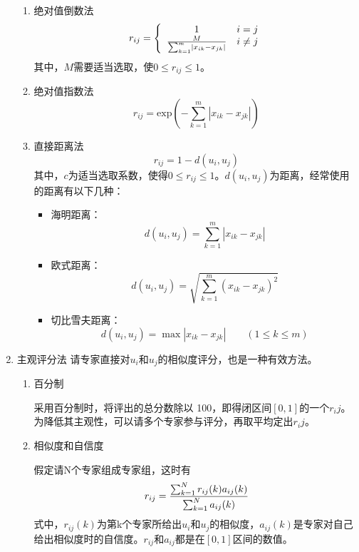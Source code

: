 \begin{enumerate}[label=（\arabic*）]
	\begin{enumerate}[label=（\alph*）]
		\item 绝对值倒数法
		\begin{equation}
			r_{ij} = \left\lbrace 
			\begin{array}{cl}
			1 & i=j \\
			{M \over \sum_{k=1}^{m} \left| x_{ik}-x_{jk} \right| } &  i\neq j
			\end{array}
			\right. 
		\end{equation}
		其中，$M$需要适当选取，使$0\leqslant r_{ij}\leqslant1$。
		\item 绝对值指数法
			\begin{equation}
				r_{ij} = \mathrm{exp}(-\sum_{k=1}^{m} \left| x_{ik}-x_{jk} \right| )
			\end{equation}
		\item 直接距离法
			\begin{equation}
				r_{ij} = 1-d(u_i,u_j)
			\end{equation}
		其中，$c$为适当选取系数，使得$0\leqslant r_{ij}\leqslant1$。$d(u_i,u_j)$为距离，经常使用的距离有以下几种：
		\begin{itemize}
			\item 海明距离：
				\begin{equation}
					d(u_i,u_j) = \sum_{k=1}^{m} \left| x_{ik}-x_{jk} \right|
				\end{equation}
			\item 欧式距离：
				\begin{equation}
				d(u_i,u_j) = \sqrt{\sum_{k=1}^{m} {(x_{ik}-x_{jk})}^2}
				\end{equation}
			\item 切比雪夫距离：
				\begin{equation}
					d(u_i,u_j) = \max \left| x_{ik}-x_{jk} \right| 
					\qquad (1\leqslant k \leqslant m)
				\end{equation}
		\end{itemize}
		
	\end{enumerate}
	\item 主观评分法
		请专家直接对$u_i$和$u_j$的相似度评分，也是一种有效方法。
		\begin{enumerate}[label=（\alph*）]
			\item 百分制
			
			采用百分制时，将评出的总分数除以 100，即得闭区间$[0,1]$的一个$r_ij$。为降低其主观性，可以请多个专家参与评分，再取平均定出$r_ij$。
			\item 相似度和自信度
			
			假定请N个专家组成专家组，这时有
				\begin{equation}
					r_{ij} = {\sum_{k=1}^{N} r_{ij}(k) a_{ij}(k)
						\over
						\sum_{k=1}^{N} a_{ij}(k)}
				\end{equation}
				式中，$r_{ij} (k)$为第k个专家所给出$u_i$和$u_j$的相似度，$a_{ij}(k)$是专家对自己给出相似度时的自信度。$r_{ij}$和$a_{ij}$都是在$[0,1]$区间的数值。
		\end{enumerate}
\end{enumerate}

